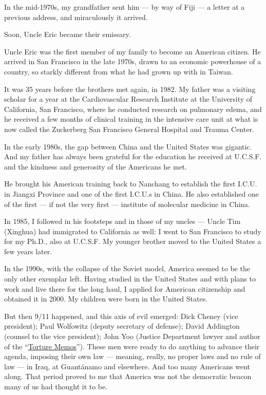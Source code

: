 In the mid-1970s, my grandfather sent him --- by way of Fiji --- a
letter at a previous address, and miraculously it arrived.

Soon, Uncle Eric became their emissary.

Uncle Eric was the first member of my family to become an American
citizen. He arrived in San Francisco in the late 1970s, drawn to an
economic powerhouse of a country, so starkly different from what he had
grown up with in Taiwan.

It was 35 years before the brothers met again, in 1982. My father was a
visiting scholar for a year at the Cardiovascular Research Institute at
the University of California, San Francisco, where he conducted research
on pulmonary edema, and he received a few months of clinical training in
the intensive care unit at what is now called the Zuckerberg San
Francisco General Hospital and Trauma Center.

In the early 1980s, the gap between China and the United States was
gigantic. And my father has always been grateful for the education he
received at U.C.S.F. and the kindness and generosity of the Americans he
met.

He brought his American training back to Nanchang to establish the first
I.C.U. in Jiangxi Province and one of the first I.C.U.s in China. He
also established one of the first --- if not the very first ---
institute of molecular medicine in China.

In 1985, I followed in his footsteps and in those of my uncles --- Uncle
Tim (Xinghua) had immigrated to California as well: I went to San
Francisco to study for my Ph.D., also at U.C.S.F. My younger brother
moved to the United States a few years later.

In the 1990s, with the collapse of the Soviet model, America seemed to
be the only other exemplar left. Having studied in the United States and
with plans to work and live there for the long haul, I applied for
American citizenship and obtained it in 2000. My children were born in
the United States.

But then 9/11 happened, and this axis of evil emerged: Dick Cheney (vice
president); Paul Wolfowitz (deputy secretary of defense); David
Addington (counsel to the vice president); John Yoo (Justice Department
lawyer and author of the
``\href{https://archive.nytimes.com/www.nytimes.com/ref/international/24MEMO-GUIDE.html?}{Torture
Memos}''). These men were ready to do anything to advance their agenda,
imposing their own law --- meaning, really, no proper laws and no rule
of law --- in Iraq, at Guantánamo and elsewhere. And too many Americans
went along. That period proved to me that America was not the democratic
beacon many of us had thought it to be.

